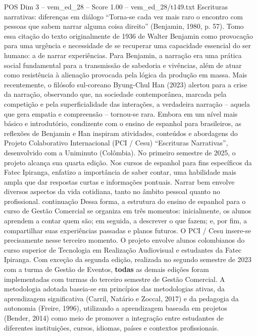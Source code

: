 \begin{textsample}{POS Dim 3 – vem\_ed\_28 – Score 1.00 – vem\_ed\_28/t149.txt}  \label{ex:f3_pos_028}
Escrituras narrativas: diferenças em diálogo “Torna-se cada vez mais raro o encontro com pessoas que sabem narrar alguma coisa direito” (Benjamin, 1980, p. 57).
Tomo essa citação do texto originalmente de 1936 de Walter Benjamin como provocação para uma urgência e necessidade de se recuperar uma capacidade essencial do ser humano: a de narrar experiências.
Para Benjamin, a narração era uma prática social fundamental para a transmissão de sabedoria e vivências, além de atuar como resistência à alienação provocada pela lógica da produção em massa.
Mais recentemente, o filósofo sul-coreano Byung-Chul Han (2023) alertou para a crise da narração, observando que, na sociedade contemporânea, marcada pela competição e pela superficialidade das interações, a verdadeira narração – aquela que gera empatia e compreensão – tornou-se rara.
Embora em um nível mais básico e introdutório, condizente com o ensino de espanhol para brasileiros, as reflexões de Benjamin e Han inspiram atividades, conteúdos e abordagens do Projeto Colaborativo Internacional (PCI / Cesu) “Escrituras Narrativas”, desenvolvido com a Uniminuto (Colômbia).
No primeiro semestre de 2025, o projeto alcança sua quarta edição.
Nos cursos de espanhol para fins específicos da Fatec Ipiranga, enfatizo a importância de saber contar, uma habilidade mais ampla que dar respostas curtas e informações pontuais.
Narrar bem envolve diversos aspectos da vida cotidiana, tanto no âmbito pessoal quanto no profissional. continuação Dessa forma, a estrutura do ensino de espanhol para o curso de Gestão Comercial se organiza em três momentos: inicialmente, os alunos aprendem a contar quem são; em seguida, a descrever o que fazem; e, por fim, a compartilhar suas experiências passadas e planos futuros.
O PCI / Cesu insere-se precisamente nesse terceiro momento.
O projeto envolve alunos colombianos do curso superior de Tecnologia em Realização Audiovisual e estudantes da Fatec Ipiranga.
Com exceção da segunda edição, realizada no segundo semestre de 2023 com a turma de Gestão de Eventos, \textbf{todas} as demais edições foram implementadas com turmas do terceiro semestre de Gestão Comercial.
A metodologia adotada baseia-se em princípios das metodologias ativas, da aprendizagem significativa (Carril, Natário e Zoccal, 2017) e da pedagogia da autonomia (Freire, 1996), utilizando a aprendizagem baseada em projetos (Bender, 2014) como meio de promover a integração entre estudantes de diferentes instituições, cursos, idiomas, países e contextos profissionais.

\end{textsample}
